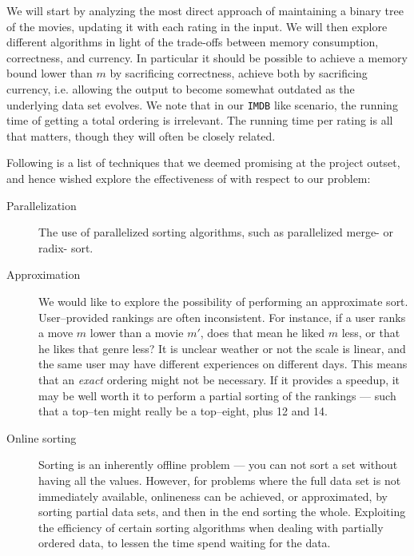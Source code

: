 \documentclass[a4paper, titlepage]{report}
\renewcommand{\%}{\scalebox{.9}{\oldpct}}
\begin{document}
We will start by analyzing the most direct approach of maintaining a binary
tree of the movies, updating it with each rating in the input.
We will then explore different algorithms in light of the trade-offs between
memory consumption, correctness, and currency. In particular it should be
possible to achieve a memory bound lower than $m$ by sacrificing correctness,
achieve both by sacrificing currency, i.e. allowing the output to become
somewhat outdated as the underlying data set evolves. We note that in our
\texttt{IMDB} like scenario, the running time of getting a total ordering is
irrelevant. The running time per rating is all that matters, though they will
often be closely related.

Following is a list of techniques that we deemed promising at the project
outset, and hence wished explore the effectiveness of with respect to our
problem:

\begin{description}
	\item[Parallelization] The use of parallelized sorting algorithms, such
		as parallelized merge- or radix- sort.

	\item[Approximation] We would like to explore the possibility of
		performing an approximate sort. User--provided rankings are
		often inconsistent. For instance, if a user ranks a move $m$
		lower than a movie $m'$, does that mean he liked $m$ less, or
		that he likes that genre less? It is unclear weather or not the
		scale is linear, and the same user may have different
		experiences on different days. This means that an \textit{exact}
		ordering might not be necessary. If it provides a speedup, it
		may be well worth it to perform a partial sorting of the
		rankings --- such that a top--ten might really be a top--eight,
		plus 12 and 14.

	\item[Online sorting] Sorting is an inherently offline problem --- you
		can not sort a set without having all the values. However, for
		problems where the full data set is not immediately available,
		onlineness can be achieved, or approximated, by sorting partial
		data sets, and then in the end sorting the whole. Exploiting the
		efficiency of certain sorting algorithms when dealing with
		partially ordered data, to lessen the time spend waiting for the
		data.

\end{description}




\end{document}
